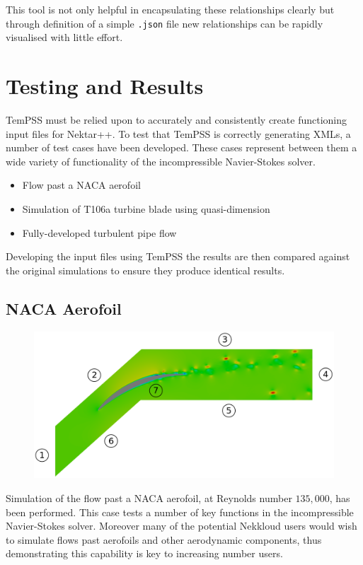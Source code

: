 \documentclass[11pt, a4paper]{report}
\begin{document}
This tool is not only helpful in encapsulating these relationships clearly but through definition of a simple \texttt{.json} file new relationships can be rapidly visualised with little effort.
\newpage
\chapter{Testing and Results}
TemPSS must be relied upon to accurately and consistently create functioning input files for Nektar++. To test that TemPSS is correctly generating XMLs, a number of test cases have been developed. These cases represent between them a wide variety of functionality of the incompressible Navier-Stokes solver.

\begin{itemize}
\item Flow past a NACA aerofoil
\item Simulation of T106a turbine blade using quasi-dimension
\item Fully-developed turbulent pipe flow
\end{itemize}

Developing the input files using TemPSS the results are then compared against the original simulations to ensure they produce identical results.

\section{NACA Aerofoil}
\begin{figure}[htb!]
 \centering
 \includegraphics[width=.75\linewidth,  clip=true, trim = 0cm 0cm 0cm 0cm]{naca_domain}
 \label{fig:naca_domain}
\end{figure}

Simulation of the flow past a NACA aerofoil, at Reynolds number $135,000$, has been performed. This case tests a number of key functions in the incompressible Navier-Stokes solver. Moreover many of the potential Nekkloud users would wish to simulate flows past aerofoils and other aerodynamic components, thus demonstrating this capability is key to increasing number users.
\end{document}
